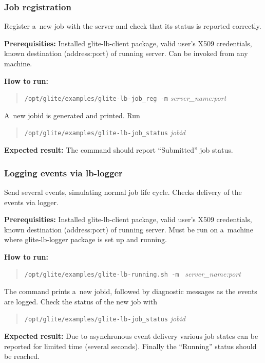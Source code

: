 \def\req{\noindent\textbf{Prerequisities:}\xspace}
\def\how{\noindent\textbf{How to run:}\xspace}
\def\result{\noindent\textbf{Expected result:}\xspace}

\subsubsection{Job registration}

Register a~new job with the \LB server and check that its status is
reported correctly.

\req Installed glite-lb-client package, valid user's X509 credentials,
known destination (address:port) of running \LB server.
Can be invoked from any machine.

\how 
\begin{quote}
\verb'/opt/glite/examples/glite-lb-job_reg -m' \emph{server\_name:port}
\end{quote}
A~new jobid is generated and printed.  Run 
\begin{quote}
\verb'/opt/glite/examples/glite-lb-job_status' \emph{jobid}
\end{quote}

\result
The command should report ``Submitted'' job status.

\subsubsection{Logging events via lb-logger}

\label{smoke-log}

Send several \LB events, simulating normal job life cycle.
Checks delivery of the events via \LB logger.

\req Installed glite-lb-client package, valid user's X509 credentials,
known destination (address:port) of running \LB server.
Must be run on a~machine where glite-lb-logger package is set up and running.

\how
\begin{quote}
\verb'/opt/glite/examples/glite-lb-running.sh -m ' \emph{server\_name:port}
\end{quote}

The command prints a~new jobid, followed by diagnostic messages as the events are logged. 
Check the status of the new job with
\begin{quote}
\verb'/opt/glite/examples/glite-lb-job_status' \emph{jobid}
\end{quote}

\result
Due to asynchronous event
delivery various job states can be reported for limited time (several seconds).
Finally the
``Running'' status should be reached.


